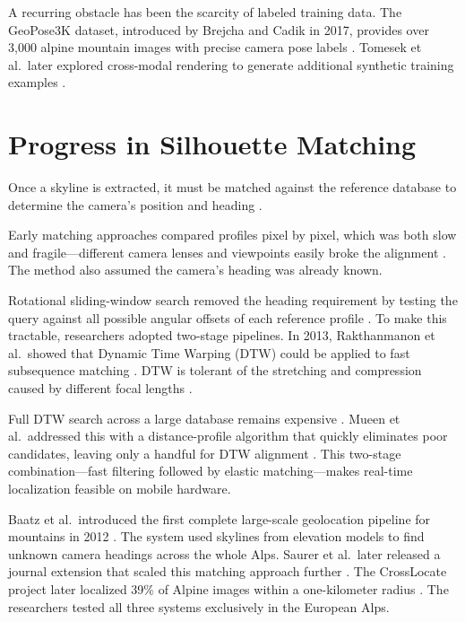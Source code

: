 A recurring obstacle has been the scarcity of labeled training data. The GeoPose3K dataset, introduced by Brejcha and Cadik in 2017, provides over 3,000 alpine mountain images with precise camera pose labels \cite{Brejcha2017}. Tomesek et al.\ later explored cross-modal rendering to generate additional synthetic training examples \cite{tomesek2022cross}.

\section{Progress in Silhouette Matching}
Once a skyline is extracted, it must be matched against the reference database to determine the camera's position and heading \cite{pan2020camera}.

Early matching approaches compared profiles pixel by pixel, which was both slow and fragile---different camera lenses and viewpoints easily broke the alignment \cite{tonge2014parsing}. The method also assumed the camera's heading was already known.

Rotational sliding-window search removed the heading requirement by testing the query against all possible angular offsets of each reference profile \cite{pan2020camera}. To make this tractable, researchers adopted two-stage pipelines. In 2013, Rakthanmanon et al.\ showed that Dynamic Time Warping (DTW) could be applied to fast subsequence matching \cite{Rakthanmanon2013}. DTW is tolerant of the stretching and compression caused by different focal lengths \cite{Rakthanmanon2013}.

Full DTW search across a large database remains expensive \cite{Rakthanmanon2013}. Mueen et al.\ addressed this with a distance-profile algorithm that quickly eliminates poor candidates, leaving only a handful for DTW alignment \cite{mueen2024mass}. This two-stage combination---fast filtering followed by elastic matching---makes real-time localization feasible on mobile hardware.

Baatz et al.\ introduced the first complete large-scale geolocation pipeline for mountains in 2012 \cite{baatz2012large}. The system used skylines from elevation models to find unknown camera headings across the whole Alps. Saurer et al.\ later released a journal extension that scaled this matching approach further \cite{saurer2016image}. The CrossLocate project later localized 39\% of Alpine images within a one-kilometer radius \cite{tomesek2022cross}. The researchers tested all three systems exclusively in the European Alps.

